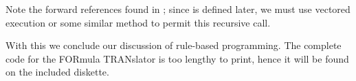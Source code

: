 \leftbar[1\linewidth]
Note the forward references found in ; since  is defined later, we must use vectored execution or some similar method to permit this recursive call.
\endleftbar

With this we conclude our discussion of rule-based programming. The complete code for the FORmula TRANslator is too lengthy to print, hence it will be found on the included diskette.